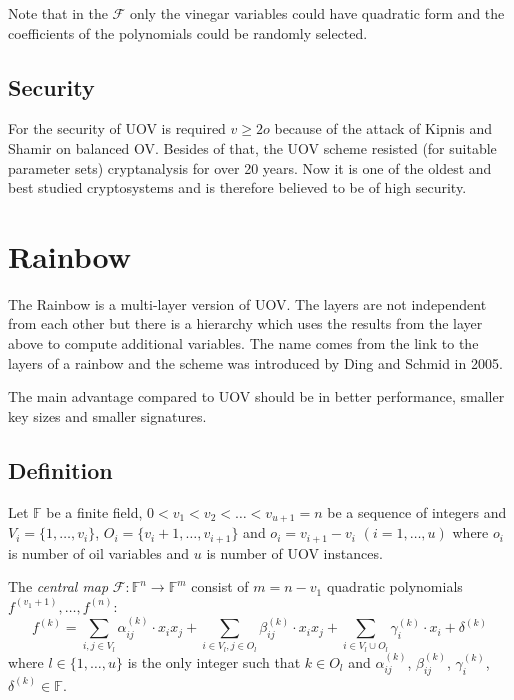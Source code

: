 \documentclass[thesis=M,english]{FITthesis}[2019/12/23]
\begin{document}
\bigskip
\noindent
Note that in the $\mathcal{F}$ only the vinegar variables could have quadratic form and the coefficients of the polynomials could be randomly selected.

\subsection{Security}
For the security of UOV is required $v \geq 2o$ because of the attack of Kipnis and Shamir on balanced OV.\cite{L-KS98} Besides of that, the UOV scheme resisted (for suitable parameter sets) cryptanalysis for over 20 years. Now it is one of the oldest and best studied cryptosystems and is therefore believed to be of high security.

\newpage
\section{Rainbow}
The Rainbow is a multi-layer version of UOV. The layers are not independent from each other but there is a hierarchy which uses the results from the layer above to compute additional variables. The name comes from the link to the layers of a rainbow and the scheme was introduced by Ding and Schmid in 2005.

\bigskip
\noindent
The main advantage compared to UOV should be in better performance, smaller key sizes and smaller signatures.

\subsection{Definition}\label{rb-definition}
Let $\mathbb{F}$ be a finite field, $0<v_1<v_2<\ldots<v_{u+1} = n$ be a sequence of integers and $V_i=\{1, \ldots, v_i\}$, $O_i=\{v_i+1, \ldots, v_{i+1}\}$ and $o_i = v_{i+1} - v_i \,\, (i=1,\ldots,u)$ where $o_i$ is number of oil variables and $u$ is number of UOV instances.

\bigskip
\noindent
The \textit{central map} $\mathcal{F}:\mathbb{F}^n \rightarrow \mathbb{F}^m$ consist of $m = n - v_1$ quadratic polynomials $f^{(v_1+1)}, \ldots, f^{(n)}$:
\[
	f^{(k)} = \sum\limits_{i,j \in V_l}{\alpha_{ij}^{(k)} \cdot x_ix_j} +  \sum\limits_{i \in V_l,j \in O_l}{\beta_{ij}^{(k)} \cdot x_ix_j}+ \sum\limits_{i \in V_l \cup O_l}{\gamma_{i}^{(k)} \cdot x_i} + \delta^{(k)}
\]
where $l \in \{1, \ldots, u\}$ is the only integer such that $k \in O_l$ and $\alpha_{ij}^{(k)}$, $\beta_{ij}^{(k)}$, $\gamma_{i}^{(k)}$, $\delta^{(k)} \in \mathbb{F}$.
\end{document}

